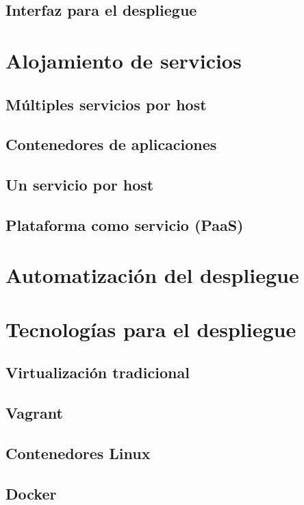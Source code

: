 \documentclass[11pt,a4paper]{article}
\begin{document}
\subsection{Interfaz para el despliegue}

\section{Alojamiento de servicios}

\subsection{Múltiples servicios por host}

\subsection{Contenedores de aplicaciones}

\subsection{Un servicio por host}

\subsection{Plataforma como servicio (PaaS)}

\section{Automatización del despliegue}

\section{Tecnologías para el despliegue}

\subsection{Virtualización tradicional}

\subsection{Vagrant}

\subsection{Contenedores Linux}

\subsection{Docker}
\end{document}
